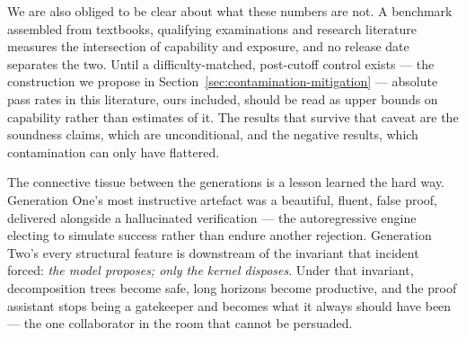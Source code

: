 \documentclass[12pt, a4paper]{article}
\begin{document}
We are also obliged to be clear about what these numbers are not. A
benchmark assembled from textbooks, qualifying examinations and research
literature measures the intersection of capability and exposure, and no
release date separates the two. Until a difficulty-matched, post-cutoff
control exists --- the construction we propose in
Section~\ref{sec:contamination-mitigation} --- absolute pass rates in this
literature, ours included, should be read as upper bounds on capability
rather than estimates of it. The results that survive that caveat are the
soundness claims, which are unconditional, and the negative results, which
contamination can only have flattered.

The connective tissue between the generations is a lesson learned the hard
way. Generation One's most instructive artefact was a beautiful, fluent,
false proof, delivered alongside a hallucinated verification --- the
autoregressive engine electing to simulate success rather than endure
another rejection. Generation Two's every structural feature is downstream
of the invariant that incident forced: \emph{the model proposes; only the
kernel disposes}. Under that invariant, decomposition trees become safe,
long horizons become productive, and the proof assistant stops being a
gatekeeper and becomes what it always should have been --- the one
collaborator in the room that cannot be persuaded.

\nocite{*}
\printbibliography
\end{document}
